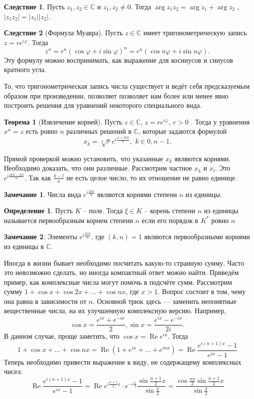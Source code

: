 \documentclass[10pt,a4paper,oneside]{book} %
\theoremstyle{definition}
\newtheorem*{rem}{Замечание}
\newtheorem*{defn}{Определение}
\newtheorem{thm}{Теорема}
\newtheorem{cor}{Следствие}
\newcommand{\mb}[1]{\mathbb{#1}}
\newcommand{\ovl}{\overline}
\newcommand{\re}{\operatorname{Re}}
\def\thrm{\begin{thm}}
\def\ethrm{\end{thm}}
\def\dfn{\begin{defn}}
\def\edfn{\end{defn}}
\def\crl{\begin{cor}}
\def\ecrl{\end{cor}}
\def\rm{\begin{rem}}
\def\erm{\end{rem}}
\begin{document}
\crl Пусть $z_1, z_2\in \mb C$  и $z_1,z_2\neq 0$. Тогда $\arg z_1z_2 = \arg z_1 + \arg z_2$ , $|z_1z_2| = |z_1 ||z_2 |$.
\ecrl

\crl[Формула Муавра] Пусть $z\in \mb C$ имеет тригонометрическую запись $z=re^{i\varphi}$. Тогда
$$z^{n}=r^{n}(\cos \varphi +i\sin \varphi )^{n}=r^{n}(\cos n\varphi +i\sin n\varphi ).$$
Эту формулу можно воспринимать, как выражение для косинусов и синусов кратного угла.
\ecrl

То, что тригонометрическая запись числа существует и ведёт себя предсказуемым образом при произведении, позволяет позволяет нам более или менее явно построить решения для уравнений некоторого специального вида.

\thrm[Извлечение корней] Пусть $z\in \mb C$, $z=re^{i\varphi}$, $r>0$ . Тогда у уравнения $x^n=z$ есть ровно $n$ различных
решений в $\mb C$, которые задаются формулой
$$ x_k =\sqrt[n]{r} e^{i\frac{\varphi + 2\pi k}{n}} ,\,\, k\in \ovl{0,n-1}.$$
\ethrm
\proof
Прямой проверкой можно установить, что указанные $x_k$ являются корнями. Необходимо доказать, что они различные. Рассмотрим частное $x_k$ и $x_l$. Это $e^{i\frac{ 2\pi k- 2\pi l}{n}}$. Так как $\frac{k-l}{n}$ не есть целое число, то их отношение не равно единице.
\endproof

\rm Числа вида $e^{i\frac{2\pi k}{n}}$ являются корнями степени $n$ из единицы.
\erm

\dfn Пусть $K$ -- поле. Тогда $\xi\in K$ -- корень степени $n$ из единицы  называется первообразным корнем степени $n$ если его порядок в $ K^*$ ровно $n$
\edfn

\rm Элементы $e^{i\frac{2\pi k}{n}}$, где $(k,n)=1$ являются первообразными корнями из единицы в $\mb C$.
\erm



Иногда в жизни бывает необходимо посчитать какую-то странную сумму. Часто это невозможно сделать, но иногда компактный ответ можно найти. Приведём пример, как комплексные числа могут помочь в подсчёте сумм.
Рассмотрим сумму $1+ \cos x + \cos 2x + \dots + \cos nx$, где $x > 1$. Вопрос состоит в том, чему она равна в зависимости от $n$. Основной трюк здесь --- заменить непонятные вещественные числа, на их улучшенную комплексную версию. Например, $$\cos x = \frac{e^{ix}+e^{-ix}}{2}, \sin x = \frac{e^{ix}-e^{-ix}}{2i}.$$
В данном случае, проще заметить, что $\cos x=\re e^{ix}$. Тогда
$$1 + \cos x+ \dots + \cos nx = \re(1+ e^{ix} + \dots + e^{inx}) = \re \frac{e^{i(n+1)x}-1}{e^{ix}-1}$$
Теперь необходимо привести выражение к виду, не содержащему комплексных чисел.
$$\re \frac{e^{i(n+1)x}-1}{e^{ix}-1} = \re e^{i\tfrac{n+1}{2}x}\cdot e^{-i\tfrac{x}{2}}\frac{\sin \tfrac{n+1}{2}x}{\sin\tfrac{x}{2}}= \frac{\cos \tfrac{nx}{2} \sin \tfrac{n+1}{2}x}{\sin\tfrac{x}{2}}$$
\end{document}
